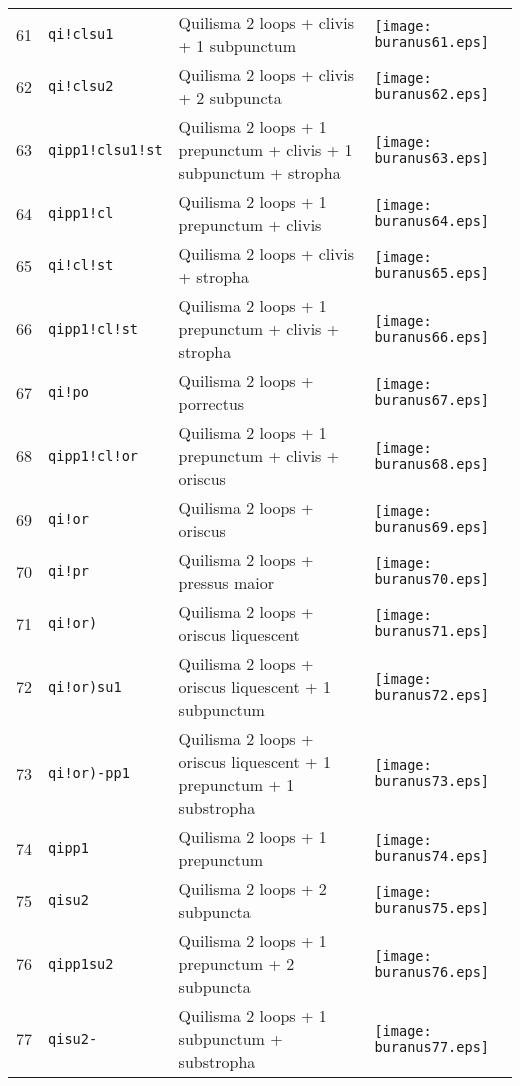 \documentclass{scrarticle}
\begin{document}
\begin{longtable}{l|l|l|l}
61 & \texttt{qi!clsu1} & Quilisma 2 loops + clivis + 1 subpunctum & \texttt{[image: buranus61.eps]} \\
62 & \texttt{qi!clsu2} & Quilisma 2 loops + clivis + 2 subpuncta & \texttt{[image: buranus62.eps]} \\
63 & \texttt{qipp1!clsu1!st} & Quilisma 2 loops + 1 prepunctum + clivis + 1 subpunctum + stropha & \texttt{[image: buranus63.eps]} \\
64 & \texttt{qipp1!cl} & Quilisma 2 loops + 1 prepunctum + clivis & \texttt{[image: buranus64.eps]} \\
65 & \texttt{qi!cl!st} & Quilisma 2 loops + clivis + stropha & \texttt{[image: buranus65.eps]} \\
66 & \texttt{qipp1!cl!st} & Quilisma 2 loops + 1 prepunctum + clivis + stropha & \texttt{[image: buranus66.eps]} \\
67 & \texttt{qi!po} & Quilisma 2 loops + porrectus & \texttt{[image: buranus67.eps]} \\
68 & \texttt{qipp1!cl!or} & Quilisma 2 loops + 1 prepunctum + clivis + oriscus & \texttt{[image: buranus68.eps]} \\
69 & \texttt{qi!or} & Quilisma 2 loops + oriscus & \texttt{[image: buranus69.eps]} \\
70 & \texttt{qi!pr} & Quilisma 2 loops + pressus maior & \texttt{[image: buranus70.eps]} \\
71 & \texttt{qi!or)} & Quilisma 2 loops + oriscus liquescent & \texttt{[image: buranus71.eps]} \\
72 & \texttt{qi!or)su1} & Quilisma 2 loops + oriscus liquescent + 1 subpunctum & \texttt{[image: buranus72.eps]} \\
73 & \texttt{qi!or)-pp1} & Quilisma 2 loops + oriscus liquescent + 1 prepunctum + 1 substropha & \texttt{[image: buranus73.eps]} \\
74 & \texttt{qipp1} & Quilisma 2 loops + 1 prepunctum & \texttt{[image: buranus74.eps]} \\
75 & \texttt{qisu2} & Quilisma 2 loops + 2 subpuncta & \texttt{[image: buranus75.eps]} \\
76 & \texttt{qipp1su2} & Quilisma 2 loops + 1 prepunctum + 2 subpuncta & \texttt{[image: buranus76.eps]} \\
77 & \texttt{qisu2-} & Quilisma 2 loops + 1 subpunctum + substropha & \texttt{[image: buranus77.eps]} \\

\end{longtable}
\end{document}

